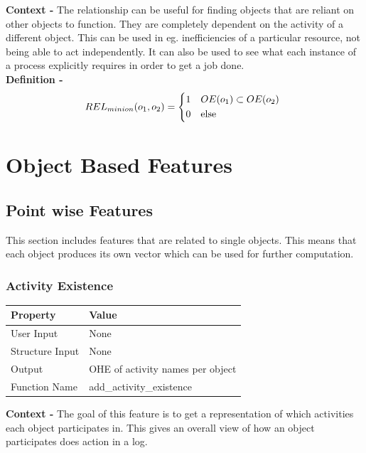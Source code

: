 \documentclass{article}
\begin{document}
\noindent\textbf{Context -} The relationship can be useful for finding objects that are reliant on other objects to function. They are completely dependent on the activity of a different object. This can be used in eg. inefficiencies of a particular resource, not being able to act independently. It can also be used to see what each instance of a process explicitly requires in order to get a job done.\\

\noindent\textbf{Definition -}
\begin{equation}
	REL_{minion}(o_1, o_2) =
	\begin{cases*}
		1 & $OE(o_1) \subset OE(o_2)$ \\
		0 & else
	\end{cases*}
\end{equation}

\section{Object Based Features}
\subsection{Point wise Features}
This section includes features that are related to single objects. This means that each object produces its own vector which can be used for further computation.
\subsubsection{Activity Existence}
\begin{center}
	\begin{tabular}{| p{3cm} p{7cm} |}
		\hline
		\textbf{Property} & \textbf{Value}\\
		\hline
		User Input & None\\
		Structure Input & None\\
		Output & OHE of activity names per object\\
		Function Name & add\_activity\_existence\\
		\hline
	\end{tabular}
\end{center}

\textbf{Context -} The goal of this feature is to get a representation of which activities each object participates in. This gives an overall view of how an object participates does action in a log.\\
\end{document}
